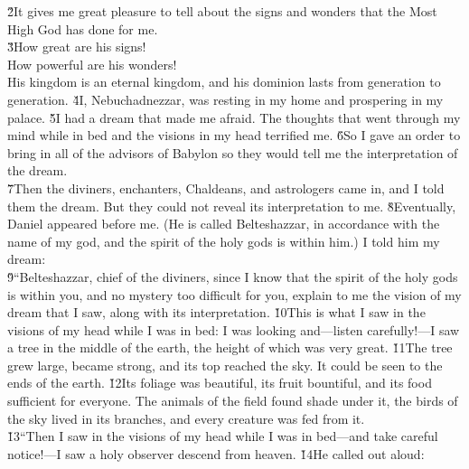\begin{poetry}
\poeml \v{2}It gives me great pleasure to tell about the signs and wonders that the Most High God has done for me. \\
\poeml \v{3}How great are his signs! \\
\poeml How powerful are his wonders! \\
\poeml His kingdom is an eternal kingdom, and his dominion lasts from generation to generation.
\poeml \v{4}I, Nebuchadnezzar, was resting in my home and prospering in my palace. \v{5}I had a dream that made me afraid. The thoughts that went through my mind while in bed and the visions in my head terrified me. \v{6}So I gave an order to bring in all of the advisors of Babylon so they would tell me the interpretation of the dream. \\
\poeml \v{7}Then the diviners, enchanters, Chaldeans, and astrologers came in, and I told them the dream. But they could not reveal its interpretation to me. \v{8}Eventually, Daniel appeared before me. (He is called Belteshazzar, in accordance with the name of my god, and the spirit of the holy gods is within him.) I told him my dream: \\
\poeml \v{9}``Belteshazzar, chief of the diviners, since I know that the spirit of the holy gods is within you, and no mystery too difficult for you, explain to me the vision of my dream that I saw, along with its interpretation. \v{10}This is what I saw in the visions of my head while I was in bed: I was looking and---listen carefully!---I saw a tree in the middle of the earth, the height of which was very great. \v{11}The tree grew large, became strong, and its top reached the sky. It could be seen to the ends of the earth. \v{12}Its foliage was beautiful, its fruit bountiful, and its food sufficient for everyone. The animals of the field found shade under it, the birds of the sky lived in its branches, and every creature was fed from it. \\
\poeml \v{13}``Then I saw in the visions of my head while I was in bed---and take careful notice!---I saw a holy observer descend from heaven. \v{14}He called out aloud: \\

\end{poetry}
